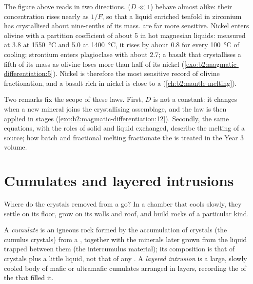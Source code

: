 The figure above reads in two directions.  ($D \ll 1$) behave
almost alike: their concentration rises nearly as $1/F$, so that a liquid enriched
tenfold in zirconium has crystallised about nine-tenths of its mass.  are far more sensitive. Nickel enters olivine with a partition
coefficient of about 5 in hot magnesian liquids: measured at 3.8 at
\qty{1550}{\celsius} and 5.0 at \qty{1400}{\celsius}, it rises by about 0.8 for every
\qty{100}{\celsius} of cooling; strontium enters
plagioclase with about 2.7; a basalt that crystallises a fifth of its mass as
olivine loses more than half of its nickel (\cref{exo:b2:magmatic-differentiation:5}). Nickel is therefore the
most sensitive record of olivine fractionation, and a basalt rich in nickel is
close to a  (\cref{ch:b2:mantle-melting}).

Two remarks fix the scope of these laws. First, $D$ is not a constant: it changes
when a new mineral joins the crystallising assemblage, and the law is then applied
in stages (\cref{exo:b2:magmatic-differentiation:12}). Secondly, the same equations, with the roles of solid and
liquid exchanged, describe the melting of a source; how batch and fractional
melting fractionate the  is treated in the Year 3 volume.

\section{Cumulates and layered intrusions}\label{sec:b2:magmatic-differentiation:cumulates}

Where do the crystals removed from a  go? In a  chamber that cools
slowly, they settle on its floor, grow on its walls and roof, and build rocks of a
particular kind.

\begin{definition}\label{def:b2:magmatic-differentiation:cumulate}
A \emph{cumulate} is an igneous rock formed by the accumulation of
crystals (the cumulus crystals) from a , together with the minerals later grown
from the liquid trapped between them (the intercumulus material); its composition
is that of crystals plus a little liquid, not that of any . A \emph{layered
intrusion} is a large, slowly cooled body of mafic or
ultramafic cumulates arranged in layers, recording the  of
the  that filled it.
\end{definition}

